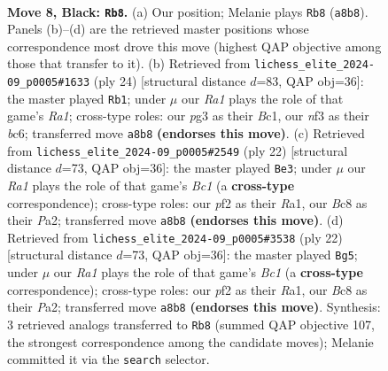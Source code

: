 \documentclass[11pt]{article}
\begin{document}
\clearpage

\begin{figure}[p]\centering
\begin{subfigure}{0.46\textwidth}\centering
\resizebox{\linewidth}{!}{%
\newchessgame
\chessboard[
  setfen={r1b2rk1/ppppqppp/2n1pn2/8/2PP4/2B1PNP1/PP3P1P/R2QKB1R b KQ - 0 8},
  showmover=false,
  pgfstyle=straightmove, color=movearrow, markmove={a8-b8}
]}
\caption{}
\end{subfigure}\hfill
\begin{subfigure}{0.46\textwidth}\centering
\resizebox{\linewidth}{!}{%
\newchessgame
\chessboard[
  setfen={r2qk1nr/1p2bp2/p1b1p1p1/3pP2p/3P4/2N2N2/PP3PPP/R1BQ1RK1 w kq - 0 13},
  showmover=false,
  pgfstyle=straightmove, color=movearrow, markmove={a1-b1}
]}
\caption{}
\end{subfigure}
\\[4pt]
\begin{subfigure}{0.46\textwidth}\centering
\resizebox{\linewidth}{!}{%
\newchessgame
\chessboard[
  setfen={r1q1k2r/1pp1npbp/p1b3p1/4p3/2P1P3/1QN2N2/PP3PPP/R1B2RK1 w kq - 2 12},
  showmover=false,
  pgfstyle=straightmove, color=movearrow, markmove={c1-e3}
]}
\caption{}
\end{subfigure}\hfill
\begin{subfigure}{0.46\textwidth}\centering
\resizebox{\linewidth}{!}{%
\newchessgame
\chessboard[
  setfen={r1q1k2r/1pp1npbp/p1b3p1/4p3/2P1P3/1QN2N2/PP3PPP/R1B2RK1 w kq - 2 12},
  showmover=false,
  pgfstyle=straightmove, color=movearrow, markmove={c1-g5}
]}
\caption{}
\end{subfigure}
\caption{\textbf{Move 8, Black: \texttt{Rb8}.} (a) Our position; Melanie plays \texttt{Rb8} (\texttt{a8b8}). Panels (b)--(d) are the retrieved master positions whose correspondence most drove this move (highest QAP objective among those that transfer to it). (b) Retrieved from \texttt{lichess\_elite\_2024-09\_p0005\#1633} (ply 24) [structural distance $d$=83, QAP obj=36]: the master played \texttt{Rb1}; under $\mu$ our \emph{Ra1} plays the role of that game's \emph{Ra1}; cross-type roles: our \emph{p}g3 as their \emph{B}c1, our \emph{n}f3 as their \emph{b}c6; transferred move \texttt{a8b8} \textbf{(endorses this move)}. (c) Retrieved from \texttt{lichess\_elite\_2024-09\_p0005\#2549} (ply 22) [structural distance $d$=73, QAP obj=36]: the master played \texttt{Be3}; under $\mu$ our \emph{Ra1} plays the role of that game's \emph{Bc1} (a \textbf{cross-type} correspondence); cross-type roles: our \emph{p}f2 as their \emph{R}a1, our \emph{B}c8 as their \emph{P}a2; transferred move \texttt{a8b8} \textbf{(endorses this move)}. (d) Retrieved from \texttt{lichess\_elite\_2024-09\_p0005\#3538} (ply 22) [structural distance $d$=73, QAP obj=36]: the master played \texttt{Bg5}; under $\mu$ our \emph{Ra1} plays the role of that game's \emph{Bc1} (a \textbf{cross-type} correspondence); cross-type roles: our \emph{p}f2 as their \emph{R}a1, our \emph{B}c8 as their \emph{P}a2; transferred move \texttt{a8b8} \textbf{(endorses this move)}. Synthesis: 3 retrieved analogs transferred to \texttt{Rb8} (summed QAP objective 107, the strongest correspondence among the candidate moves); Melanie committed it via the \texttt{search} selector.}

\end{figure}
\end{document}
